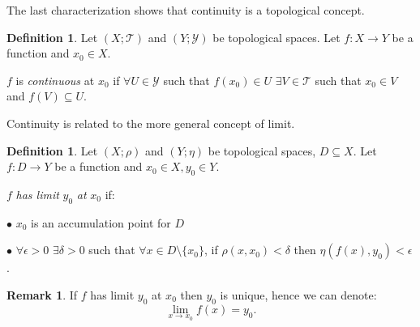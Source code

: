 \documentclass[12pt]{amsbook}
\theoremstyle{definition}
\newtheorem{definition}[theorem]{Definition}
\newtheorem{remark}[theorem]{Remark}
\newcommand{\cT}{{\mathcal T}}
\newcommand{\ra}{\rightarrow} %
\begin{document}
The last characterization shows that continuity is a topological concept.


\begin{definition}
Let $(X; \cT)$ and $(Y; \mathcal{Y})$ be topological spaces. Let $f: X \ra Y$ be a function and $x_0 \in X$. 

$f$ is \emph{continuous} at $x_0$ if $\forall U \in \mathcal{Y}$ such that $f(x_0) \in U$ $\exists V \in \cT$ such that $x_0 \in V$ and $f(V) \subseteq U$.

\end{definition} 

Continuity is related to the more general concept of limit.

\begin{definition}
Let $(X; \rho)$ and $(Y; \eta)$ be topological spaces, $D \subseteq X$. Let $f: D \ra Y$ be a function and $x_0 \in X, y_0 \in Y$. 

$f$ \emph{has limit} $y_0$ \emph{at} $x_0$ if:

$\bullet$ $x_0$ is an accumulation point for $D$

$\bullet$ $\forall \epsilon > 0$ $\exists \delta > 0$ such that $\forall x \in D \setminus \{x_0\}$, if $\rho(x, x_0) < \delta$ then $\eta(f(x), y_0) < \epsilon$.

\end{definition} 

\begin{remark} 
If $f$ has limit $y_0$ at $x_0$ then $y_0$ is unique, hence we can denote: \begin{equation*}\lim_{x \ra x_0} f(x) = y_0.\end{equation*}
\end{remark}

\end{document}
